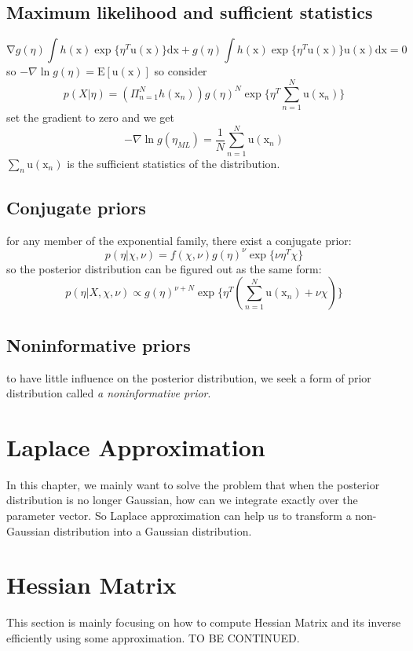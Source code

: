 \documentclass[a4paper]{book}
\begin{document}
\subsection{Maximum likelihood and sufficient statistics}
\begin{equation}\label{1.4.3}
  \mathrm  \nabla g(\eta) \int h(\mathrm  x)\exp\{\eta^T\mathrm  u(\mathrm  x)\}\mathrm  {dx} +g(\eta)\int h(\mathrm  x)\exp\{\eta^T\mathrm u(\mathrm x)\} \mathrm u(\mathrm  x) \mathrm {dx} = 0
\end{equation}
so $-\nabla \ln g(\eta) = \mathrm E[\mathrm  u(\mathrm  x)] $\newline
so consider
$$p(X|\eta)  = (\Pi_{n=1}^Nh(\mathrm  x_n))g(\eta)^N\exp\{\eta^T\sum_{n=1}^N\mathrm  u(\mathrm  x_n) \}$$
set the gradient to zero and we get
\begin{equation}\label{1.4.4}
  -\nabla \ln g(\eta_{ML} ) = \frac1N\sum_{n=1}^N\mathrm  u(\mathrm  x_n)
\end{equation}
$\sum_n\mathrm  u(\mathrm  x_n)$ is the sufficient statistics of the distribution.
\subsection{Conjugate priors}
for any member of the exponential family, there exist a conjugate  prior:
$$p(\eta|\chi, \nu) = f(\chi,\nu)g(\eta)^\nu\exp\{\nu\eta^T\chi\}$$
so the posterior distribution can be figured out as the same form:
$$p(\eta|X,\chi,\nu) \propto g(\eta)^{\nu+N}\exp\{\eta^T(\sum_{n=1}^N\mathrm  u(\mathrm  x_n)+\nu\chi)\}$$
\subsection{Noninformative priors}
to have little influence on the posterior distribution, we seek a form of prior distribution called \emph{a noninformative prior}.






\section{Laplace Approximation}
In this chapter, we mainly want to solve the problem that when the posterior distribution is no longer Gaussian, how can we integrate exactly over the parameter vector.\newline
So Laplace approximation can help us to transform a non-Gaussian distribution  into a Gaussian distribution.
\section{Hessian Matrix}
This section is mainly focusing on how to compute Hessian Matrix and its inverse efficiently using some approximation.  TO BE CONTINUED. 
\end{document}
